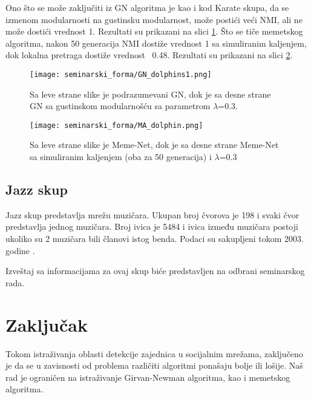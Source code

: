 \documentclass[a4paper]{article}
\begin{document}
Ono što se može zaključiti iz GN algoritma je kao i kod Karate skupa, da se izmenom modularnosti na gustinsku modularnost, može postići veći NMI, ali ne može dostići vrednost 1. Rezultati su prikazani na slici \ref{fig:GN_Dolp_1}. Što se tiče memetskog algoritma, nakon 50 generacija NMI dostiže vrednost 1 sa simuliranim kaljenjem, dok lokalna pretraga dostiže vrednost ~0.48. Rezultati su prikazani na slici \ref{fig:Meme_dolp1}. 

\begin{figure}[h!]
\centering
\captionsetup{justification=centering,margin=1cm}
\begin{center}
\texttt{[image: seminarski\_forma/GN\_dolphins1.png]}
\end{center}
\caption{Sa leve strane slike je podrazumevani GN, dok je sa desne strane GN sa gustinskom modularnošću sa parametrom $\lambda$=0.3.}
\label{fig:GN_Dolp_1}
\end{figure}

\begin{figure}[h!]
\centering
\captionsetup{justification=centering,margin=1cm}
\begin{center}
\texttt{[image: seminarski\_forma/MA\_dolphin.png]}
\end{center}
\caption{Sa leve strane slike je Meme-Net, dok je sa desne strane Meme-Net sa simuliranim kaljenjem (oba za 50 generacija) i $\lambda$=0.3}
\label{fig:Meme_dolp1}
\end{figure}

\subsection{Jazz skup}
Jazz skup predstavlja mrežu muzičara. Ukupan broj čvorova je 198 i svaki čvor predstavlja jednog muzičara. Broj ivica je 5484 i ivica između muzičara postoji ukoliko su 2 muzičara bili članovi istog benda. Podaci su sakupljeni tokom 2003. godine \cite{konect:2016:arenas-jazz}.

Izveštaj sa informacijama za ovaj skup biće predstavljen na odbrani seminarskog rada.

\newpage

\section{Zaključak}
\label{sec:zakljucak}
Tokom istraživanja oblasti detekcije zajednica u socijalnim mrežama, zaključeno je da se u zavisnosti od problema različiti algoritmi ponašaju bolje ili lošije. Naš rad je ograničen na istraživanje Girvan-Newman algoritma, kao i memetskog algoritma.
\end{document}
